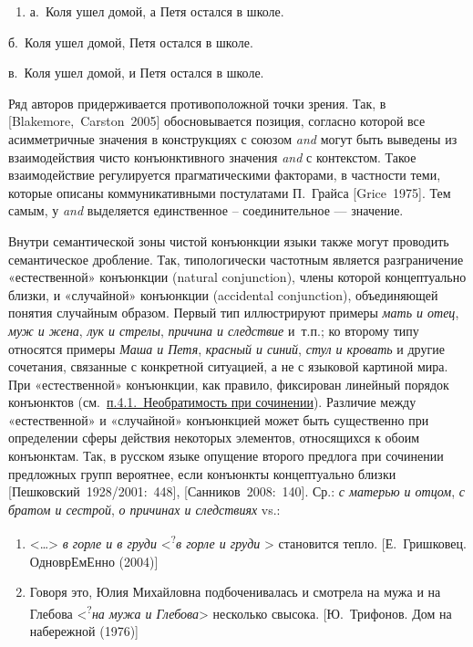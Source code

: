 \begin{enumerate}
  \def\labelenumi{(\arabic{enumi})}
  \setcounter{enumi}{157}
  \item
        а.~Коля ушел домой, а Петя остался в школе.
\end{enumerate}

б.~Коля ушел домой, Петя остался в школе.

в.~Коля ушел домой, и Петя остался в школе.

Ряд авторов придерживается противоположной точки зрения. Так, в
{[}Blakemore,~Carston~2005{]} обосновывается позиция, согласно которой
все асимметричные значения в конструкциях с союзом \textit{and} могут быть
выведены из взаимодействия чисто конъюнктивного значения \textit{and} с
контекстом. Такое взаимодействие регулируется прагматическими факторами,
в частности теми, которые описаны коммуникативными постулатами П.~Грайса
{[}Grice~1975{]}. Тем самым, у \textit{and} выделяется единственное --
соединительное --- значение.

Внутри семантической зоны чистой конъюнкции языки также могут проводить
семантическое дробление. Так, типологически частотным является
разграничение «естественной» конъюнкции (natural conjunction), члены
которой концептуально близки, и «случайной» конъюнкции (accidental
conjunction), объединяющей понятия случайным образом. Первый тип
иллюстрируют примеры \textit{мать и отец}, \textit{муж и жена}, \textit{лук и
  стрелы}, \textit{причина и следствие} и~т.п.; ко второму типу относятся
примеры \textit{Маша и Петя}, \textit{красный и синий}, \textit{стул и
  кровать} и другие сочетания, связанные с конкретной ситуацией, а не с
языковой картиной мира. При «естественной» конъюнкции, как правило,
фиксирован линейный порядок конъюнктов
(см.~\underline{п.4.1.~Необратимость при сочинении}). Различие между
«естественной» и «случайной» конъюнкцией может быть существенно при
определении сферы действия некоторых элементов, относящихся к обоим
конъюнктам. Так, в русском языке опущение второго предлога при сочинении
предложных групп вероятнее, если конъюнкты концептуально близки
{[}Пешковский~1928/2001:~448{]}, {[}Санников~2008:~140{]}. Ср.: \textit{с
  матерью и отцом}, \textit{с братом и сестрой}, \textit{о причинах и
  следствиях} vs.:

\begin{enumerate}
  \def\labelenumi{(\arabic{enumi})}
  \setcounter{enumi}{158}
  \item
        \textless\ldots\textgreater{} \textit{в горле и в груди}
        \textless{}\textsuperscript{?}\textit{в горле и груди} \textgreater{}
        становится тепло. {[}Е.~Гришковец. ОдноврЕмЕнно (2004){]}
  \item
        Говоря это, Юлия Михайловна подбоченивалась и смотрела на мужа и на
        Глебова \textless{}\textsuperscript{?}\textit{на мужа и
          Глебова}\textgreater{} несколько свысока. {[}Ю.~Трифонов. Дом на
        набережной (1976){]}
\end{enumerate}

